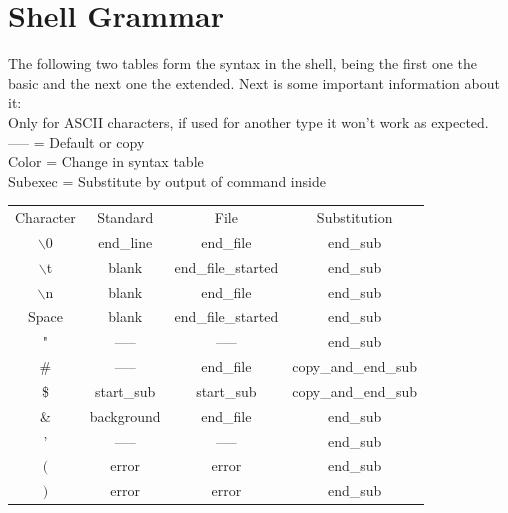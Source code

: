 \documentclass[12pt,a4paper]{report}
\begin{document}
\part{Shell Grammar}
The following two tables form the syntax in the shell, being the first one the basic and the next one the extended. Next is some important information about it:\\
Only for ASCII characters, if used for another type it won't work as expected.\\
----- = Default or copy\\
Color = Change in syntax table\\
\textcolor[HTML]{C500FF}{Subexec} = Substitute by output of command inside
\begin{table}[H]
	\centering
	\begin{tabular}{ |c|c|c|c| }
		\hline
		\rowcolor{lightgray} \multicolumn{4}{|c|}{Basic Syntax Table} \\
		\hline
		Character & Standard & File \cellcolor[HTML]{BEE9F9}& Substitution \cellcolor[HTML]{FFF49C}\\
		\hline
		$\backslash$0 & end\_line & end\_file \cellcolor[HTML]{BEE9F9}&  end\_sub \cellcolor[HTML]{FFF49C}\\
		$\backslash$t & blank & end\_file\_started \cellcolor[HTML]{BEE9F9}&  end\_sub \cellcolor[HTML]{FFF49C}\\
		$\backslash$n & blank & end\_file \cellcolor[HTML]{BEE9F9}&  end\_sub \cellcolor[HTML]{FFF49C}\\
		Space & blank & end\_file\_started \cellcolor[HTML]{BEE9F9}&  end\_sub\cellcolor[HTML]{FFF49C}\\
		" & ----- & ----- &  end\_sub\cellcolor[HTML]{FFF49C}\\
		\# & ----- & end\_file \cellcolor[HTML]{BEE9F9}& copy\_and\_end\_sub \cellcolor[HTML]{FFF49C}\\
		\$ & start\_sub \cellcolor[HTML]{FFF49C}& start\_sub \cellcolor[HTML]{FFF49C} & copy\_and\_end\_sub \cellcolor[HTML]{FFF49C}\\
		\& & background & end\_file \cellcolor[HTML]{BEE9F9}&  end\_sub\cellcolor[HTML]{FFF49C}\\
		' & ----- & ----- &  end\_sub\cellcolor[HTML]{FFF49C}\\
		$($ & error \cellcolor[HTML]{FF0044}& error \cellcolor[HTML]{FF0044} & end\_sub \cellcolor[HTML]{FFF49C}\\
		$)$ & error \cellcolor[HTML]{FF0044}& error \cellcolor[HTML]{FF0044} & end\_sub \cellcolor[HTML]{FFF49C}\\

\end{tabular}
\end{table}
\end{document}
